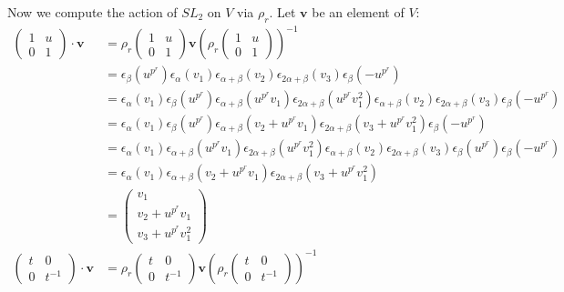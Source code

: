 																			 Now we compute the action of $SL_2$ on $V$ via $\rho_r$. Let $\mathbf{v}$ be an element of $V$:
																			 \begin{align*}
																			 \left(\begin{matrix} 1 & u \\ 0 & 1\end{matrix}\right) \cdot \mathbf{v} &= \rho_r\left(\begin{matrix} 1 & u \\ 0 & 1\end{matrix}\right) \mathbf{v}\left( \rho_r\left(\begin{matrix} 1 & u \\ 0 & 1\end{matrix}\right)\right)^{-1} \\
																				 &=\epsilon_\beta (u^{p^r}) \epsilon_\alpha (v_1)\epsilon_{\alpha+\beta}(v_2) \epsilon_{2\alpha+\beta}(v_3) \epsilon_\beta (-u^{p^r}) \\
																				 &=\epsilon_\alpha (v_1) \epsilon_\beta (u^{p^r}) \epsilon_{\alpha+\beta}(u^{p^r}v_1) \epsilon_{2\alpha+\beta}(u^{p^r}v_1^2) \epsilon_{\alpha+\beta}(v_2) \epsilon_{2\alpha+\beta}(v_3) \epsilon_\beta (-u^{p^r})  \\
																				 &=\epsilon_\alpha (v_1) \epsilon_\beta (u^{p^r}) \epsilon_{\alpha+\beta}(v_2 + u^{p^r}v_1) \epsilon_{2\alpha+\beta}(v_3 + u^{p^r}v_1^2)  \epsilon_\beta (-u^{p^r})  \\
																				 &=\epsilon_\alpha (v_1) \epsilon_{\alpha+\beta}(u^{p^r}v_1) \epsilon_{2\alpha+\beta}(u^{p^r}v_1^2) \epsilon_{\alpha+\beta}(v_2) \epsilon_{2\alpha+\beta}(v_3)\epsilon_\beta (u^{p^r})  \epsilon_\beta (-u^{p^r})  \\
																				 &=\epsilon_\alpha (v_1)  \epsilon_{\alpha+\beta}(v_2 + u^{p^r}v_1) \epsilon_{2\alpha+\beta}(v_3 + u^{p^r}v_1^2) \\
																				 &= \left(\begin{matrix} v_1 \\ v_2 + u^{p^r}v_1\\ v_3 + u^{p^r}v_1^2 \end{matrix}\right)\\
																				 \left(\begin{matrix} t & 0 \\ 0 & t^{-1}\end{matrix}\right) \cdot \mathbf{v} &=
																				 \rho_r\left(\begin{matrix} t & 0 \\ 0 & t^{-1}\end{matrix}\right) \mathbf{v}\left( \rho_r\left(\begin{matrix} t & 0 \\ 0 & t^{-1}\end{matrix}\right)\right)^{-1} \\

\end{align*}

